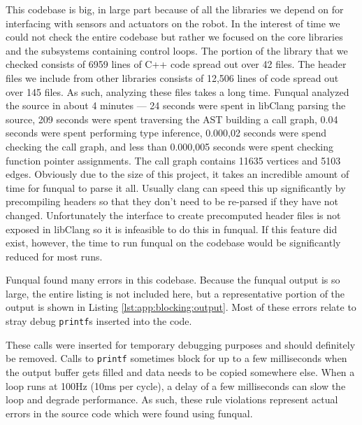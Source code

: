 This codebase is big, in large part because of all the libraries we depend on for interfacing with sensors and actuators on the robot.  In the interest of time we could not check the entire codebase but rather we focused on the core libraries and the subsystems containing control loops.  The portion of the library that we checked consists of 6959 lines of C++ code spread out over 42 files.  The header files we include from other libraries consists of 12,506 lines of code spread out over 145 files.  As such, analyzing these files takes a long time.  Funqual analyzed the source in about 4 minutes --- 24 seconds were spent in libClang parsing the source, 209 seconds were spent traversing the AST building a call graph, 0.04 seconds were spent performing type inference, 0.000,02 seconds were spend checking the call graph, and less than 0.000,005 seconds were spent checking function pointer assignments.  The call graph contains 11635 vertices and 5103 edges.  Obviously due to the size of this project, it takes an incredible amount of time for funqual to parse it all.  Usually clang can speed this up significantly by precompiling headers so that they don't need to be re-parsed if they have not changed.  Unfortunately the interface to create precomputed header files is not exposed in libClang so it is infeasible to do this in funqual.  If this feature did exist, however, the time to run funqual on the codebase would be significantly reduced for most runs.

Funqual found many errors in this codebase.  Because the funqual output is so large, the entire listing is not included here, but a representative portion of the output is shown in Listing \ref{lst:app:blocking:output}.  Most of these errors relate to stray debug \lstinline{printf}s inserted into the code.  

These calls were inserted for temporary debugging purposes and should definitely be removed.  Calls to \lstinline{printf} sometimes block for up to a few milliseconds when the output buffer gets filled and data needs to be copied somewhere else.  When a loop runs at 100Hz (10ms per cycle), a delay of a few milliseconds can slow the loop and degrade performance.  As such, these rule violations represent actual errors in the source code which were found using funqual.  

